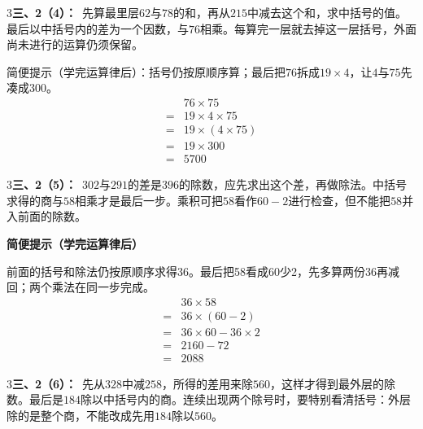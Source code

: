 \documentclass[multi=snippet,border={5bp 20bp 5bp 5bp}]{standalone}
\newenvironment{snippet}[3]{\begin{minipage}{#1bp}\color{answerred}\fontsize{#2}{#3}\selectfont\raggedright}{\end{minipage}}
\begin{document}
\begin{snippet}{505}{11.5}{14}\begin{multicols}{3}\raggedcolumns \textbf{三、2（4）：}\ 先算最里层\(62\)\allowbreak 与\(78\)\allowbreak 的和，再从\(215\)\allowbreak 中减去这个和，求中括号的值。最后以中括号内的差为一个因数，与\(76\)\allowbreak 相乘。每算完一层就去掉这一层括号，外面尚未进行的运算仍须保留。\par 简便提示（学完运算律后）：括号仍按原顺序算；最后把\(76\)\allowbreak 拆成\(19\times4\)\allowbreak ，让\(4\)\allowbreak 与\(75\)\allowbreak 先凑成\(300\)\allowbreak 。\[\begin{aligned}&76\times75\\={}&19\times4\times75\\={}&19\times(4\times75)\\={}&19\times300\\={}&5700\end{aligned}\]\end{multicols}\end{snippet}
\begin{snippet}{505}{11.5}{14}\begin{multicols}{3}\raggedcolumns \textbf{三、2（5）：}\ \(302\)\allowbreak 与\(291\)\allowbreak 的差是\(396\)\allowbreak 的除数，应先求出这个差，再做除法。中括号求得的商与\(58\)\allowbreak 相乘才是最后一步。乘积可把\(58\)\allowbreak 看作\(60-2\)\allowbreak 进行检查，但不能把\(58\)\allowbreak 并入前面的除数。\par\textbf{简便提示（学完运算律后）}\par 前面的括号和除法仍按原顺序求得36。最后把58看成60少2，先多算两份36再减回；两个乘法在同一步完成。\[\begin{aligned}&36\times58\\={}&36\times(60-2)\\={}&36\times60-36\times2\\={}&2160-72\\={}&2088\end{aligned}\]\end{multicols}\end{snippet}
\begin{snippet}{505}{11.5}{14}\begin{multicols}{3}\raggedcolumns \textbf{三、2（6）：}\ 先从\(328\)\allowbreak 中减\(258\)\allowbreak ，所得的差用来除\(560\)\allowbreak ，这样才得到最外层的除数。最后是\(184\)\allowbreak 除以中括号内的商。连续出现两个除号时，要特别看清括号：外层除的是整个商，不能改成先用\(184\)\allowbreak 除以\(560\)\allowbreak 。\end{multicols}\end{snippet}
\end{document}
